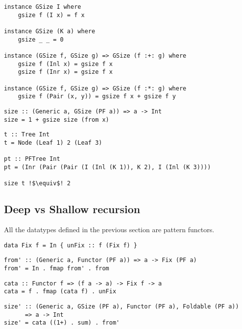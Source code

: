 \begin{verbatim}
instance GSize I where
    gsize f (I x) = f x

instance GSize (K a) where
    gsize _ _ = 0

instance (GSize f, GSize g) => GSize (f :+: g) where
    gsize f (Inl x) = gsize f x
    gsize f (Inr x) = gsize f x

instance (GSize f, GSize g) => GSize (f :*: g) where
    gsize f (Pair (x, y)) = gsize f x + gsize f y
\end{verbatim}

\begin{verbatim}
size :: (Generic a, GSize (PF a)) => a -> Int
size = 1 + gsize size (from x)
\end{verbatim}


\begin{verbatim}
t :: Tree Int
t = Node (Leaf 1) 2 (Leaf 3)

pt :: PFTree Int
pt = (Inr (Pair (Pair (I (Inl (K 1)), K 2), I (Inl (K 3)))) 

size t !$\equiv$! 2
\end{verbatim}

\subsection{Deep vs Shallow recursion}

All the datatypes defined in the previous section are pattern functors.  


\begin{verbatim}
data Fix f = In { unFix :: f (Fix f) }
\end{verbatim}
    
\begin{verbatim}
from' :: (Generic a, Functor (PF a)) => a -> Fix (PF a)
from' = In . fmap from' . from
\end{verbatim}

\begin{verbatim}
cata :: Functor f => (f a -> a) -> Fix f -> a
cata = f . fmap (cata f) . unFix
\end{verbatim}

\begin{verbatim}
size' :: (Generic a, GSize (PF a), Functor (PF a), Foldable (PF a)) 
      => a -> Int
size' = cata ((1+) . sum) . from'
\end{verbatim}


